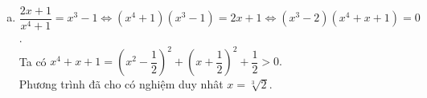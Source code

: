 \begin{bt}
{\begin{enumerate}[a)]
					\begin{itemize}
						\item Với $a = 1$ thì $x^2-x+1=1 \Leftrightarrow x(x-1)=0 \Leftrightarrow \hoac{&x=0 \\ &x=1.}$
						\item Với $a = -2$ thì $x^2 - x + 1 = -2 \Leftrightarrow x^2 - x + 3 = 0$ (vô nghiệm). 
					\end{itemize}
					Vậy phương trình đã cho có hai nghiệm: $0$; $1$.
				\item $\dfrac{2x+1}{x^4+1} = x^3-1 \Leftrightarrow (x^4+1)(x^3-1)=2x+1 \Leftrightarrow (x^3-2)(x^4+x+1) = 0$. \\
				Ta có $x^4 + x + 1 = \left(x^2 - \dfrac{1}{2}\right)^2 + \left(x+\dfrac{1}{2}\right)^2 + \dfrac{1}{2} > 0.$ \\
				Phương trình đã cho có nghiệm duy nhât $x = \sqrt[3]{2}$.
			\end{enumerate}
		}
	\end{bt}
	
